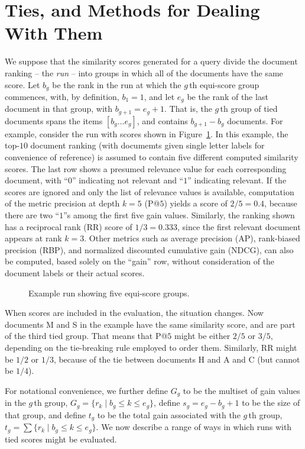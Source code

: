 \section{Ties, and Methods for Dealing With Them}
\label{sec-ties}


We suppose that the similarity scores generated for a query divide
the document ranking -- the {\emph{run}} -- into groups in which all
of the documents have the same score.
Let $b_g$ be the rank in the run at which the $g$\,th equi-score
group commences, with, by definition, $b_1=1$, and let $e_g$ be the
rank of the last document in that group, with $b_{g+1}=e_g+1$.
That is, the $g$\,th group of tied documents spans the items
$[b_g\ldots e_g]$, and contains $b_{g+1}-b_g$ documents.
For example, consider the run with scores shown in
Figure~\ref{fig-example}.
In this example, the top-$10$ document ranking (with documemts given
single letter labels for convenience of reference) is assumed to
contain five different computed similarity scores.
The last row shows a presumed relevance value for each corresponding
document, with ``$0$'' indicating not relevant and ``$1$'' indicating
relevant.
If the scores are ignored and only the list of relevance values is
available, computation of the metric precision at depth $k=5$ (P@$5$)
yields a score of $2/5=0.4$, because there are two ``$1$''s among the
first five gain values.
Similarly, the ranking shown has a reciprocal rank (RR) score of
$1/3=0.333$, since the first relevant document appears at rank $k=3$.
Other metrics such as average precision (AP), rank-biased precision
(RBP), and normalized discounted cumulative gain (NDCG), can also be
computed, based solely on the ``gain'' row, without consideration of
the document labels or their actual scores.

\begin{figure}[t]
\centering

\caption{Example run showing five equi-score groups.
\label{fig-example}}
\end{figure}

When scores are included in the evaluation, the situation changes.
Now documents M and S in the example have the same similarity score,
and are part of the third tied group.
That means that P@$5$ might be either $2/5$ or $3/5$, depending on
the tie-breaking rule employed to order them.
Similarly, RR might be $1/2$ or $1/3$, because of the tie between
documents H and A and C (but cannot be $1/4$).

For notational convenience, we further define $G_g$ to be the
multiset of gain values in the $g$\,th group,
	$G_g =\{r_k\mid b_g \le k \le e_g\}$, 
define $s_g=e_g-b_g+1$ to be the size of that group, and define $t_g$
to be the total gain associated with the $g$\,th group,
	$t_g = \sum \{r_k\mid b_g \le k \le e_g\}$.
We now describe a range of ways in which runs with tied scores might
be evaluated.

